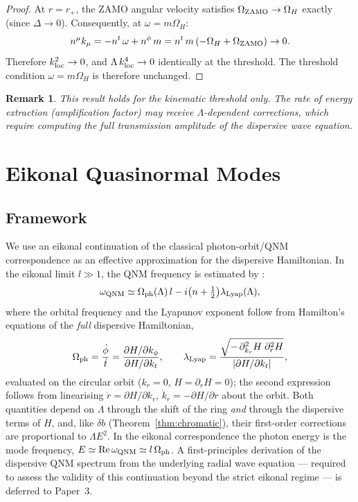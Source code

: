 \documentclass[12pt,a4paper]{article}
\newtheorem{remark}{Remark}
\newcommand{\kloc}{k_{\rm loc}}
\newcommand{\OmH}{\Omega_H}
\newcommand{\Omph}{\Omega_{\rm ph}}
\newcommand{\lLyap}{\lambda_{\rm Lyap}}
\begin{document}
\begin{proof}
At $r=r_+$, the ZAMO angular velocity satisfies
$\Omega_{\rm ZAMO}\to\OmH$ exactly (since $\Delta\to 0$).
Consequently, at $\omega=m\OmH$:
\begin{equation}
  n^\mu k_\mu = -n^t\,\omega + n^\phi\,m
    = n^t\,m\,(-\OmH + \Omega_{\rm ZAMO}) \to 0.
\end{equation}
Therefore $\kloc^2\to 0$, and $\Lambda\,\kloc^4\to 0$ identically at
the threshold.
The threshold condition $\omega=m\OmH$ is therefore unchanged.
\end{proof}

\begin{remark}
This result holds for the kinematic threshold only.
The rate of energy extraction (amplification factor) may receive
$\Lambda$-dependent corrections, which require computing the
full transmission amplitude of the dispersive wave equation.
\end{remark}

\section{Eikonal Quasinormal Modes}
\label{sec:qnm}

\subsection{Framework}

We use an eikonal continuation of the classical photon-orbit/QNM
correspondence as an effective approximation for the dispersive
Hamiltonian. In the eikonal limit $l\gg 1$, the QNM frequency is
estimated by \citep{Mashhoon1985,Cardoso2009}:
\begin{equation}\label{eq:qnm}
  \omega_{\rm QNM} \simeq \Omph(\Lambda)\,l
    - i\bigl(n+\tfrac{1}{2}\bigr)\lLyap(\Lambda),
\end{equation}
where the orbital frequency and the Lyapunov exponent follow from
Hamilton's equations of the \emph{full} dispersive Hamiltonian,
\begin{equation}\label{eq:omlyap}
  \Omph=\frac{\dot\phi}{\dot t}=\frac{\partial H/\partial k_\phi}{\partial H/\partial k_t},\qquad
  \lLyap=\frac{\sqrt{-\,\partial^2_{k_r}H\;\partial^2_r H}}{|\partial H/\partial k_t|},
\end{equation}
evaluated on the circular orbit ($k_r=0$, $H=\partial_rH=0$); the second
expression follows from linearising $\dot r=\partial H/\partial k_r$,
$\dot k_r=-\partial H/\partial r$ about the orbit. Both quantities depend on
$\Lambda$ through the shift of the ring \emph{and} through the dispersive
terms of $H$, and, like $\delta b$ (Theorem~\ref{thm:chromatic}), their first-order
corrections are proportional to $\Lambda E^2$. In the eikonal correspondence
the photon energy is the mode frequency, $E\simeq{\rm Re}\,\omega_{\rm QNM}\simeq l\,\Omph$. A first-principles derivation of the
dispersive QNM spectrum from the underlying radial wave equation ---
required to assess the validity of this continuation beyond the
strict eikonal regime --- is deferred to Paper~3.
\end{document}
